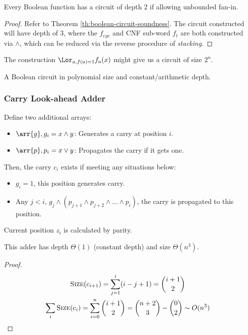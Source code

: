 \begin{theorem}
Every Boolean function has a circuit of depth 2 if allowing unbounded fan-in.
\end{theorem}

\begin{proof}
Refer to Theorem \ref{th:boolean-circuit-soundness}. The circuit constructed will have depth of 3, where the $f_{eye}$ and CNF sub-word $f_t$ are both constructed via $\land$, which can be reduced via the reverse procedure of \emph{stacking}.
\end{proof}

\begin{remark}
The construction \(\Lor_{a, f(a)=1}f_a(x)\) might give us a circuit
of size \(2^n\).
\end{remark}

\begin{definition}[Acceptable]
A Boolean circuit in polynomial size and constant/arithmetic depth.
\end{definition}

\subsubsection{Carry Look-ahead Adder}\label{subsubse:carry-look-ahead}

Define two additional arrays:

\begin{itemize}
    \item \(\arr{g}, g_i=x \land y\): Generates a carry at position $i$.
    \item \(\arr{p}, p_i = x \lor y\): Propagates the carry if it gets one.
\end{itemize}

Then, the carry $c_i$ exists if meeting any situations below:
\begin{itemize}
    \item $g_i = 1$, this position generates carry.
    \item Any $j < i$, $g_j \land (p_{j+1} \land p_{j+2} \land \dots \land p_i)$, the carry is propagated to this position.
\end{itemize}

Current position $z_i$ is calculated by parity.

This adder has depth \by \(\Theta(1)\) (constant depth) and size \by $\Theta(n^3)$.

\begin{proof}
\begin{gather*}
    \text{\textsc{Size}}(c_{i+1}) = \sum_{j=1}^i(i-j+1) = \binom{i+1}{2}\\
    \sum_i \text{\textsc{Size}}(c_i) = \sum_{i=0}^n\binom{i+1}{2}= \binom{n+2}{3}-\binom{0}{2} \sim O(n^3)
\end{gather*}
\end{proof}

